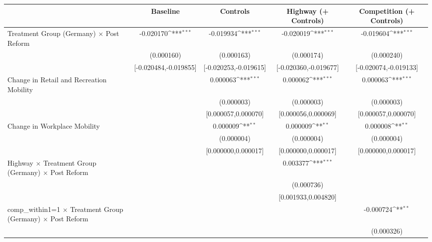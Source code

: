 {
\def\sym#1{\ifmmode^{#1}\else\(^{#1}\)\fi}
\begin{tabular}{l*{4}{c}}
\toprule
                    &\multicolumn{1}{c}{Baseline}&\multicolumn{1}{c}{Controls}&\multicolumn{1}{c}{Highway (+ Controls)}&\multicolumn{1}{c}{Competition (+ Controls)}\\
\midrule
Treatment Group (Germany) $\times$ Post Reform&   -0.020170\sym{***}&   -0.019934\sym{***}&   -0.020019\sym{***}&   -0.019604\sym{***}\\
                    &  (0.000160)         &  (0.000163)         &  (0.000174)         &  (0.000240)         \\
                    &[-0.020484,-0.019855]         &[-0.020253,-0.019615]         &[-0.020360,-0.019677]         &[-0.020074,-0.019133]         \\
Change in Retail and Recreation Mobility&                     &    0.000063\sym{***}&    0.000062\sym{***}&    0.000063\sym{***}\\
                    &                     &  (0.000003)         &  (0.000003)         &  (0.000003)         \\
                    &                     &[0.000057,0.000070]         &[0.000056,0.000069]         &[0.000057,0.000070]         \\
Change in Workplace Mobility&                     &    0.000009\sym{**} &    0.000009\sym{**} &    0.000008\sym{**} \\
                    &                     &  (0.000004)         &  (0.000004)         &  (0.000004)         \\
                    &                     &[0.000000,0.000017]         &[0.000000,0.000017]         &[0.000000,0.000017]         \\
Highway $\times$ Treatment Group (Germany) $\times$ Post Reform&                     &                     &    0.003377\sym{***}&                     \\
                    &                     &                     &  (0.000736)         &                     \\
                    &                     &                     &[0.001933,0.004820]         &                     \\
comp\_within1=1 $\times$ Treatment Group (Germany) $\times$ Post Reform&                     &                     &                     &   -0.000724\sym{**} \\
                    &                     &                     &                     &  (0.000326)         \\

\end{tabular}}
